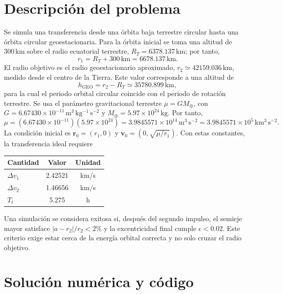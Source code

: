 \documentclass[12pt]{article}
\begin{document}
\section{Descripción del problema}

Se simula una transferencia desde una órbita baja terrestre circular hasta una
órbita circular geoestacionaria. Para la órbita inicial se toma una altitud de
$300\,\mathrm{km}$ sobre el radio ecuatorial terrestre,
$R_T=6378.137\,\mathrm{km}$; por tanto,
\begin{equation}
  r_1=R_T+300\,\mathrm{km}=6678.137\,\mathrm{km}.
\end{equation}
El radio objetivo es el radio geoestacionario aproximado,
$r_2\simeq42159.036\,\mathrm{km}$, medido desde el centro de la Tierra. Este valor
corresponde a una altitud de
\begin{equation}
  h_{\mathrm{GEO}}=r_2-R_T\simeq35780.899\,\mathrm{km},
\end{equation}
para la cual el periodo orbital circular coincide con el periodo de rotación
terrestre. Se usa el parámetro gravitacional terrestre
$\mu=GM_\oplus$, con $G=6.67430\times10^{-11}\,\mathrm{m^3\,kg^{-1}\,s^{-2}}$
y $M_\oplus=5.97\times10^{24}\,\mathrm{kg}$. Por tanto,
\begin{equation}
  \mu=(6.67430\times10^{-11})(5.97\times10^{24})
  =3.9845571\times10^{14}\,\mathrm{m^3\,s^{-2}}
  =3.9845571\times10^{5}\,\mathrm{km^3\,s^{-2}}.
\end{equation}
La condición inicial es $\mathbf r_0=(r_1,0)$ y
$\mathbf v_0=(0,\sqrt{\mu/r_1})$. Con estas constantes, la transferencia ideal
requiere
\begin{center}
\begin{tabular}{lcc}
\toprule
Cantidad & Valor & Unidad \\
\midrule
$\Delta v_1$ & 2.42521 & km/s \\
$\Delta v_2$ & 1.46656 & km/s \\
$T_t$ & 5.275 & h \\
\bottomrule
\end{tabular}
\end{center}

Una simulación se considera exitosa si, después del segundo impulso, el semieje
mayor satisface $|a-r_2|/r_2<2\%$ y la excentricidad final cumple
$\epsilon<0.02$.
Este criterio exige estar cerca de la energía orbital correcta y no solo cruzar
el radio objetivo.

\section{Solución numérica y código}
\end{document}
